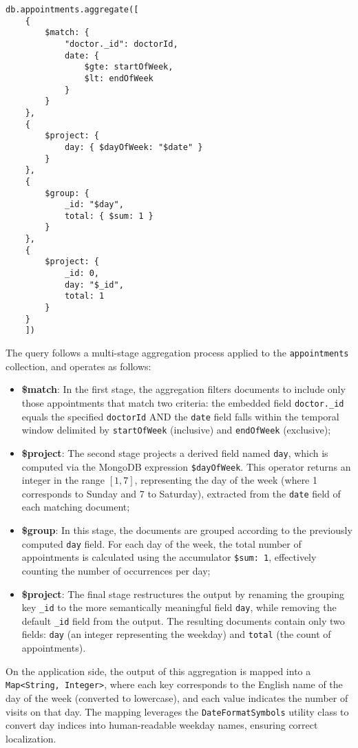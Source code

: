 \begin{lstlisting}[language=mongodb, caption={Equivalent MongoDB Aggregation Pipeline for the Number of Visits in a Week analytic}]
	db.appointments.aggregate([
	{
		$match: {
			"doctor._id": doctorId,
			date: {
				$gte: startOfWeek,
				$lt: endOfWeek
			}
		}
	},
	{
		$project: {
			day: { $dayOfWeek: "$date" }
		}
	},
	{
		$group: {
			_id: "$day",
			total: { $sum: 1 }
		}
	},
	{
		$project: {
			_id: 0,
			day: "$_id",
			total: 1
		}
	}
	])
\end{lstlisting}

The query follows a multi-stage aggregation process applied to the \texttt{appointments} collection, and operates as follows:
\begin{itemize}
	\item \textbf{\$match}: In the first stage, the aggregation filters documents to include only those appointments that match two criteria: the embedded field \texttt{doctor.\_id} equals the specified \texttt{doctorId} AND the \texttt{date} field falls within the temporal window delimited by \texttt{startOfWeek} (inclusive) and \texttt{endOfWeek} (exclusive);
	
	\item \textbf{\$project}: The second stage projects a derived field named \texttt{day}, which is computed via the MongoDB expression \texttt{\$dayOfWeek}. This operator returns an integer in the range \([1,7]\), representing the day of the week (where 1 corresponds to Sunday and 7 to Saturday), extracted from the \texttt{date} field of each matching document;
	
	\item \textbf{\$group}: In this stage, the documents are grouped according to the previously computed \texttt{day} field. For each day of the week, the total number of appointments is calculated using the accumulator \texttt{\$sum: 1}, effectively counting the number of occurrences per day;
	
	\item \textbf{\$project}: The final stage restructures the output by renaming the grouping key \texttt{\_id} to the more semantically meaningful field \texttt{day}, while removing the default \texttt{\_id} field from the output. The resulting documents contain only two fields: \texttt{day} (an integer representing the weekday) and \texttt{total} (the count of appointments).
\end{itemize}

On the application side, the output of this aggregation is mapped into a \texttt{Map<String, Integer>}, where each key corresponds to the English name of the day of the week (converted to lowercase), and each value indicates the number of visits on that day. The mapping leverages the \texttt{DateFormatSymbols} utility class to convert day indices into human-readable weekday names, ensuring correct localization.

